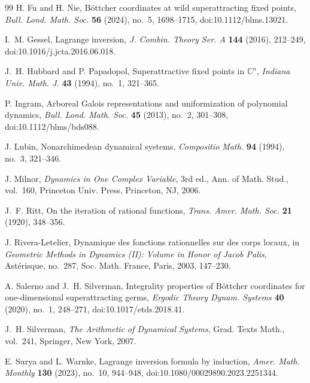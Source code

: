 \documentclass[11pt]{amsart}
\numberwithin{equation}{section}
\begin{document}
\begin{thebibliography}{99}
H. Fu and H. Nie,
B\"ottcher coordinates at wild superattracting fixed points,
\emph{Bull. Lond. Math. Soc.} \textbf{56} (2024), no.~5, 1698--1715, doi:10.1112/blms.13021.


I.~M. Gessel,
Lagrange inversion,
\emph{J. Combin. Theory Ser. A} \textbf{144} (2016), 212--249, doi:10.1016/j.jcta.2016.06.018.

J.~H. Hubbard and P. Papadopol,
Superattractive fixed points in $\mathbb{C}^n$,
\emph{Indiana Univ. Math. J.} \textbf{43} (1994), no.~1, 321--365.


P. Ingram,
Arboreal Galois representations and uniformization of polynomial dynamics,
\emph{Bull. Lond. Math. Soc.} \textbf{45} (2013), no.~2, 301--308, doi:10.1112/blms/bds088.

J. Lubin,
Nonarchimedean dynamical systems,
\emph{Compositio Math.} \textbf{94} (1994), no.~3, 321--346.


J. Milnor,
\emph{Dynamics in One Complex Variable}, 3rd ed.,
Ann. of Math. Stud., vol.~160, Princeton Univ. Press, Princeton, NJ, 2006.

J.~F. Ritt,
On the iteration of rational functions,
\emph{Trans. Amer. Math. Soc.} \textbf{21} (1920), 348--356.



J. Rivera-Letelier,
Dynamique des fonctions rationnelles sur des corps locaux,
in \emph{Geometric Methods in Dynamics (II): Volume in Honor of Jacob Palis},
Ast\'erisque, no.~287, Soc. Math. France, Paris, 2003, 147--230.



A. Salerno and J.~H. Silverman,
Integrality properties of B\"ottcher coordinates for one-dimensional superattracting germs,
\emph{Ergodic Theory Dynam. Systems} \textbf{40} (2020), no.~1, 248--271, doi:10.1017/etds.2018.41.

J.~H. Silverman,
\emph{The Arithmetic of Dynamical Systems},
Grad. Texts Math., vol.~241, Springer, New York, 2007.


E. Surya and L. Warnke,
Lagrange inversion formula by induction,
\emph{Amer. Math. Monthly} \textbf{130} (2023), no.~10, 944--948, doi:10.1080/00029890.2023.2251344.

\end{thebibliography}
\end{document}
